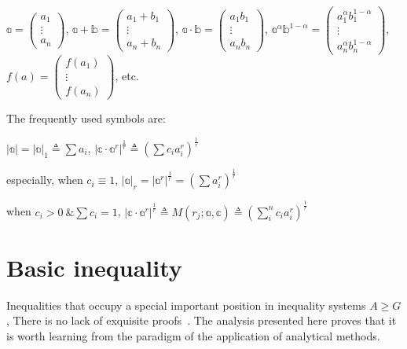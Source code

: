 \documentclass[12pt,a4paper,reqno]{amsart}
\theoremstyle{plain}
\theoremstyle{definition}
\begin{document}
$\mathbb{a}=\left( \begin{array}{c} a_1 \\ \vdots \\ a_n \end{array} \right)$, 
$\mathbb{a} + \mathbb{b} = \left( \begin{array}{c} a_1 + b_1 \\ \vdots \\ a_n + b_n \end{array} \right)$,
$\mathbb{a} \cdot \mathbb{b} = \left( \begin{array}{c} a_1 b_1 \\ \vdots \\ a_n b_n \end{array} \right)$, 
$\mathbb{a}^{\alpha} \mathbb{b}^{1-\alpha} = \left( \begin{array}{c} a_1^{\alpha} b_1^{1-\alpha} \\ \vdots \\ a_n^{\alpha} b_n^{1-\alpha} \end{array} \right)$, 
$f(a)=\left( \begin{array}{c} f(a_1) \\ \vdots \\ f(a_n) \end{array} \right)$, etc. 

The frequently used symbols are:

$|\mathbb{a}| = |\mathbb{a}|_1 \triangleq \sum{a_i}$, $|\mathbb{c}\cdot \mathbb{a}^r|^{\frac{1}{r}}  \triangleq \left( \sum{c_i a_i^r}\right)^{\frac{1}{r}}$

especially, when $c_i \equiv 1$, $|\mathbb{a}|_r = |\mathbb{a}^r|^{\frac{1}{r}} = \left( \sum{a_i^r}\right)^{\frac{1}{r}}$

when $c_i > 0 ~\& \sum{c_i} = 1$, $|\mathbb{c}\cdot \mathbb{a}^r|^{\frac{1}{r}}\triangleq M(r_j;\mathbb{a}, \mathbb{c}) \triangleq (\sum_{i}^{n}c_i a_i^r)^{\frac{1}{r}}$ 


\section{Basic inequality}

Inequalities that occupy a special important position in inequality systems $A\geqslant G$, There is no lack of exquisite proofs~\cite{shi1964}. The analysis presented here proves that it is worth learning from the paradigm of the application of analytical methods. 
\end{document}
